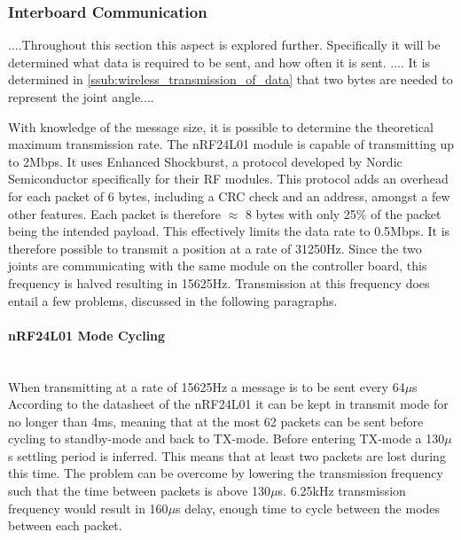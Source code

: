 \subsubsection{Interboard Communication} %
\label{ssub:interboard_communication}
....Throughout this section this aspect is explored further.
Specifically it will be determined what data is required to be sent, and how often it is sent.
.... It is determined in \ref{ssub:wireless_transmission_of_data} that two bytes are needed to represent the joint angle....

With knowledge of the message size, it is possible to determine the theoretical maximum transmission rate.
The nRF24L01 module is capable of transmitting up to 2Mbps.
It uses Enhanced Shockburst, a protocol developed by Nordic Semiconductor specifically for their RF modules.
This protocol adds an overhead for each packet of 6 bytes, including a CRC check and an address, amongst a few other features.
Each packet is therefore $\approx$ 8 bytes with only 25\% of the packet being the intended payload.
This effectively limits the data rate to 0.5Mbps.
It is therefore possible to transmit a position at a rate of 31250Hz.
Since the two joints are communicating with the same module on the controller board, this frequency is halved resulting in 15625Hz.
Transmission at this frequency does entail a few problems, discussed in the following paragraphs.
\paragraph{nRF24L01 Mode Cycling}~\\ %
\label{par:nrf24l01_mode_cycling}
When transmitting at a rate of 15625Hz a message is to be sent every 64$\mu$s
According to the datasheet of the nRF24L01 it can be kept in transmit mode for no longer than 4ms, meaning that at the most 62 packets can be sent before cycling to standby-mode and back to TX-mode.
Before entering TX-mode a 130$\mu$s settling period is inferred.
This means that at least two packets are lost during this time.
The problem can be overcome by lowering the transmission frequency such that the time between packets is above 130$\mu$s.
6.25kHz transmission frequency would result in 160$\mu$s delay, enough time to cycle between the modes between each packet.
